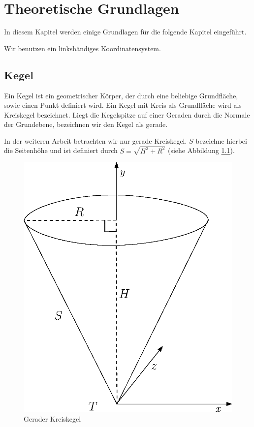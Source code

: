 \chapter{Theoretische Grundlagen}
\label{ch:theory}

In diesem Kapitel werden einige Grundlagen für die folgende Kapitel eingeführt. 


Wir benutzen ein linkshändiges Koordinatensystem.



\section{Kegel}
\label{s:cone}

\begin{definition}[Kegel]
	Ein Kegel ist ein geometrischer Körper, der durch eine beliebige Grundfläche, sowie einen Punkt definiert wird.
	Ein Kegel mit Kreis als Grundfläche wird als Kreiskegel bezeichnet. Liegt die Kegelspitze auf einer Geraden durch die Normale der Grundebene, bezeichnen wir den Kegel als gerade.
\end{definition}

In der weiteren Arbeit betrachten wir nur gerade Kreiskegel.
$S$ bezeichne hierbei die Seitenhöhe und ist definiert durch $S = \sqrt{H^2 + R^2}$ (siehe Abbildung \ref{fig:cone}).

\begin{figure}[!htb]
	\centering
	\includegraphics[scale=.5]{images/fullCone.eps}
	\caption{Gerader Kreiskegel}
	\label{fig:cone}
\end{figure}

